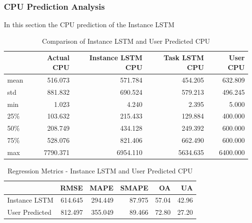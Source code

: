     \subsubsection{CPU Prediction Analysis}
    \label{sec:cpu-prediction-analysis-instance-knowledge-lstm-evaluation}

      In this section the CPU prediction of the Instance LSTM

      \begin{table}
        \centering
        \caption{Comparison of Instance LSTM and User Predicted CPU}
        \label{tab:comparison-instance-lstm-user-predicted-cpu}

        \begin{tabular}{|l|rrrr|}
          \toprule
          {} &  Actual CPU &  Instance LSTM CPU &  Task LSTM CPU &  User CPU \\
          \midrule
          mean &     516.073 &            571.784 &        454.205 &   632.809 \\
          std  &     881.832 &            690.524 &        579.213 &   496.245 \\
          min  &       1.023 &              4.240 &          2.395 &     5.000 \\
          25\%  &     103.632 &            215.433 &        129.884 &   400.000 \\
          50\%  &     208.749 &            434.128 &        249.392 &   600.000 \\
          75\%  &     528.076 &            821.406 &        662.490 &   600.000 \\
          max  &    7790.371 &           6954.110 &       5634.635 &  6400.000 \\
          \bottomrule
          \end{tabular}
      \end{table}
      
      \begin{table}
        \centering
        \caption{Regression Metrics - Instance LSTM and User Predicted CPU}
        \label{tab:regression-metrics-instance-lstm-user-predicted-cpu}

        \begin{tabular}{|l|rrrrr|}
          \toprule
          {} &     RMSE &     MAPE &   SMAPE &     OA &     UA \\
          \midrule
          Instance LSTM   &  614.645 &  294.449 &  87.975 &  57.04 &  42.96 \\
          User Predicted &  812.497 &  355.049 &  89.466 &  72.80 &  27.20 \\
          \bottomrule
        \end{tabular}
      \end{table}

